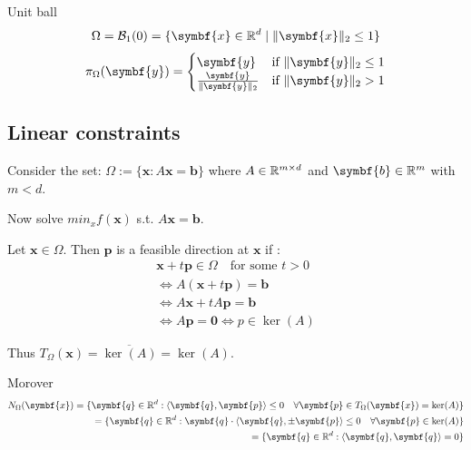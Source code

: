 \begin{example}{Unit ball}{}
  \[
    \Omega = \mathcal{B}_1(0) = \{ \symbf{x} \in \R^d \mid \norm{\symbf{x}}_2 \leq 1 \}
  \]
  \[
    \pi_{\Omega}(\symbf{y}) = \begin{cases}
      \symbf{y}                            & \text{if } \norm{\symbf{y}}_2 \leq 1 \\
      \frac{\symbf{y}}{\norm{\symbf{y}}_2} & \text{if } \norm{\symbf{y}}_2 > 1
    \end{cases}
  \]
\end{example}

\subsection{Linear constraints}

Consider the set: \(\Omega := \{\symbf{x} : A\symbf{x} = \symbf{b}\}\) where \(A \in \mathbb{R}^{m \times d}\) and \(\symbf{b} \in \R^m\) with \(m < d\).

Now solve \(min_x f(\symbf{x})\) s.t. \(A\symbf{x} = \symbf{b}\).

Let \(\symbf{x} \in \Omega\). Then \(\symbf{p}\) is a feasible direction at \(\symbf{x}\) if :
\begin{align*}
  \symbf{x} + t \symbf{p} \in \Omega \quad \text{for some } t > 0 \\
  \iff A(\symbf{x} + t \symbf{p}) = \symbf{b}                     \\
  \iff A\symbf{x} + t A\symbf{p} = \symbf{b}                      \\
  \iff A\symbf{p} = \symbf{0} \iff p\in \ker(A)
\end{align*}

Thus \(T_{\Omega}(\symbf{x}) = \overline{\ker(A)} = \ker(A)\).

Morover
\begin{align*}
  N_{\Omega}(\symbf{x}) = \{\symbf{q} \in \R^d : \inner{\symbf{q}, \symbf{p}} \leq 0 \quad \forall \symbf{p} \in T_{\Omega}(\symbf{x}) = \ker(A)\} \\
  = \{\symbf{q} \in \R^d : \symbf{q} \cdot \inner{\symbf{q}, \pm \symbf{p}} \leq 0 \quad \forall \symbf{p} \in \ker(A)\}                           \\
  = \{\symbf{q} \in \R^d : \inner{\symbf{q}, \symbf{q}} = 0\}
\end{align*}

